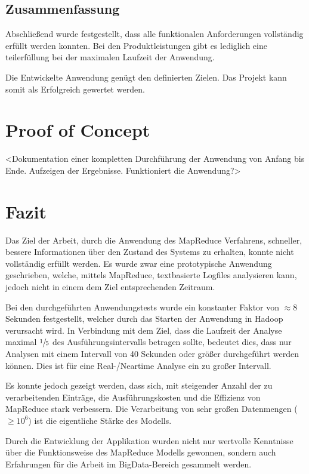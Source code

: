 \subsection{Zusammenfassung}
Abschließend wurde festgestellt, dass alle funktionalen Anforderungen vollständig erfüllt werden konnten. Bei den Produktleistungen gibt es lediglich eine teilerfüllung bei der maximalen Laufzeit der Anwendung.

Die Entwickelte Anwendung genügt den definierten Zielen. Das Projekt kann somit als Erfolgreich gewertet werden. 


\section{Proof of Concept}
<Dokumentation einer kompletten Durchführung der Anwendung von Anfang bis Ende. Aufzeigen der Ergebnisse. Funktioniert die Anwendung?>

\section{Fazit}\label{sec:Fazit}
Das Ziel der Arbeit, durch die Anwendung des MapReduce Verfahrens, schneller, bessere Informationen über den Zustand des Systems zu erhalten, konnte nicht vollständig erfüllt werden. Es wurde zwar eine prototypische Anwendung geschrieben, welche, mittels MapReduce, textbasierte Logfiles analysieren kann, jedoch nicht in einem dem Ziel entsprechenden Zeitraum.

Bei den durchgeführten Anwendungstests wurde ein konstanter Faktor von $\approx 8$ Sekunden festgestellt, welcher durch das Starten der Anwendung in Hadoop verursacht wird. In Verbindung mit dem Ziel, dass die Laufzeit der Analyse maximal $\sfrac{1}{5}$ des Ausführungsintervalls betragen sollte, bedeutet dies, dass nur Analysen mit einem Intervall von 40 Sekunden oder größer durchgeführt werden können. Dies ist für eine Real-/Neartime Analyse ein zu großer Intervall.

Es konnte jedoch gezeigt werden, dass sich, mit steigender Anzahl der zu verarbeitenden Einträge, die Ausführungskosten und die Effizienz von MapReduce stark verbessern. Die Verarbeitung von sehr großen Datenmengen ($\geq10^6$) ist die eigentliche Stärke des Modells.

Durch die Entwicklung der Applikation wurden nicht nur wertvolle Kenntnisse über die Funktionsweise des MapReduce Modells gewonnen, sondern auch Erfahrungen für die Arbeit im BigData-Bereich gesammelt werden.

